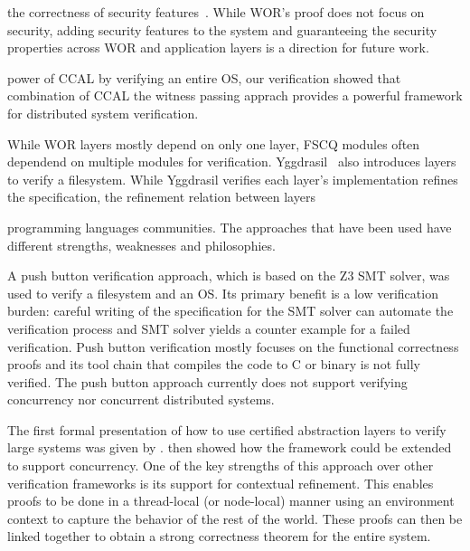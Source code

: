 the correctness of security features~\cite{vale, komodo, ironclad, expressos}. 
While WOR's proof does not focus on security, adding security features to the system 
and guaranteeing the security properties across WOR and application layers is a direction for future work.  

power of CCAL by verifying an entire OS, our verification showed that combination of CCAL the witness passing apprach provides a powerful framework for distributed system verification.

While WOR layers mostly depend on only one layer, FSCQ modules often dependend 
on multiple modules for verification. Yggdrasil~\cite{pushbuttonfs} also introduces layers to verify a filesystem. 
While Yggdrasil verifies each layer's implementation refines the specification, 
the refinement relation between layers 

programming languages communities. 
The approaches that have been used have different strengths, 
weaknesses and philosophies.


A push button verification approach, which is based on the Z3 SMT solver, 
was used to verify a filesystem and an OS. 
Its primary benefit is a low verification burden: careful writing of the specification for 
the SMT solver can automate the verification process 
and SMT solver yields a counter example for a failed verification. 
Push button verification mostly focuses on the functional correctness proofs and its tool chain
that compiles the code to C or binary is not fully verified. 
The push button approach currently does not support verifying concurrency nor concurrent distributed systems.

The first formal presentation of how to use certified abstraction layers to verify large systems
was given by \cite{deepspec}.
\cite{concurrency} then showed how the framework could be extended to support concurrency.
One of the key strengths of this approach over other verification frameworks
is its support for contextual refinement.
This enables proofs to be done in a thread-local (or node-local) manner using an environment context to
capture the behavior of the rest of the world.
These proofs can then be linked together to obtain a strong correctness theorem for the entire system.

